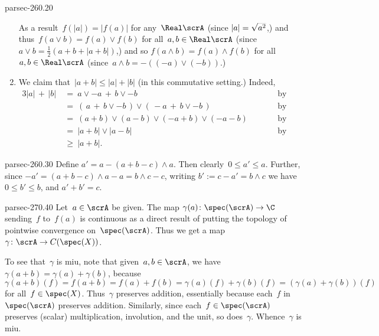 \documentclass[b5page]{book}
\begin{document}
\begin{solution}{parsec-260.20}
\begin{enumerate}
As a result~$f(\left|a\right|)=\left|f(a)\right|$
for any~$\Real\scrA$ (since $\left|a\right|=\smash{\sqrt{a^2}}$,)
and thus~$f(a\vee b)=f(a)\vee f(b)$
for all~$a,b\in\Real\scrA$
(since $a\vee b=\frac{1}{2}(a+b+\left|a+b\right|)$,)
and so $f(a\wedge b)=f(a)\wedge f(b)$
for all~$a,b\in\Real\scrA$
(since~$a\wedge b = -((-a)\vee(-b))$.)
\item
We claim that~$\left|a+b\right|\leq \left|a\right|+\left|b\right|$
(in this commutative setting.)
Indeed,
\begin{alignat*}{3}
\left|a\right| \,+\, \left|b\right|
\ &= \ 
a\vee -a\,+\, b\vee -b
\qquad &&\text{by point~1} \\
\ &= \ 
(\,a\,+\,b\vee -b\,)\vee (\,-a \,+\, b\vee -b\,)
\qquad &&\text{by point~2} \\
\ &= \ 
(a+b)\vee(a-b)\vee (-a+b)\vee (-a-b)
\qquad &&\text{by point~2} \\
\ &= \ 
\left|a+b\right| \vee \left | a-b\right|
\qquad &&\text{by point~1} \\
\ &\geq \ 
\left|a+b\right|.
\end{alignat*}
\end{enumerate}
\end{solution}
\begin{solution}{parsec-260.30}
Define $a' = a-(a+b-c)\wedge a$.
Then clearly~$0\leq a' \leq a$.
Further, since $-a' = (a+b-c)\wedge a-a
= b\wedge c -c$,
writing $b':= c-a'=b\wedge c$ 
we have~$0\leq b'\leq b$,  and $a'+b'=c$.
\end{solution}
\begin{solution}{parsec-270.40}
Let~$a\in \scrA$ be given.
The map $\gamma(a)\colon \spec(\scrA)\to \C$
sending~$f$ to~$f(a)$
is continuous as
a direct result
of putting the topology of pointwise convergence
on~$\spec(\scrA)$.
Thus we get a map $\gamma\colon \scrA\to C(\spec(X))$.

To see that~$\gamma$ is miu,
note that given~$a,b\in\scrA$,
we have $\gamma(a+b)=\gamma(a)+\gamma(b)$,
because $\gamma(a+b)(f)
=f(a+b)=f(a)+f(b)=\gamma(a)(f)+\gamma(b)(f)
= (\gamma(a)+\gamma(b))(f)$ for all~$f\in \spec(X)$.
Thus~$\gamma$ preserves addition,
essentially because each~$f$ in~$\spec(\scrA)$
preserves addition.
Similarly,
since each~$f\in\spec(\scrA)$
preserves (scalar) multiplication,
involution, and the unit,
so does~$\gamma$.
Whence~$\gamma$ is miu.
\end{solution}
\end{document}
